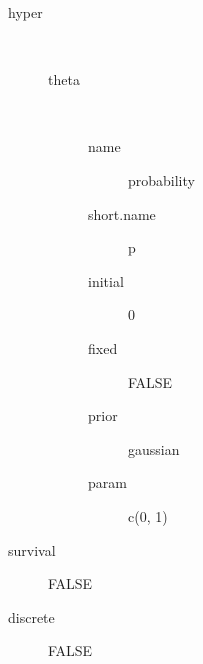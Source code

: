 \begin{description}
	\item[hyper]\ 
	 \begin{description}
	 	\item[theta]\ 
	 	 \begin{description}
	 	 	 \item[ name ] probability 
	 	 	 \item[ short.name ] p 
	 	 	 \item[ initial ] 0 
	 	 	 \item[ fixed ] FALSE 
	 	 	 \item[ prior ] gaussian 
	 	 	 \item[ param ] c(0, 1) 
	 	 \end{description}
	 \end{description}
	 \item[ survival ] FALSE 
	 \item[ discrete ] FALSE 
\end{description}
